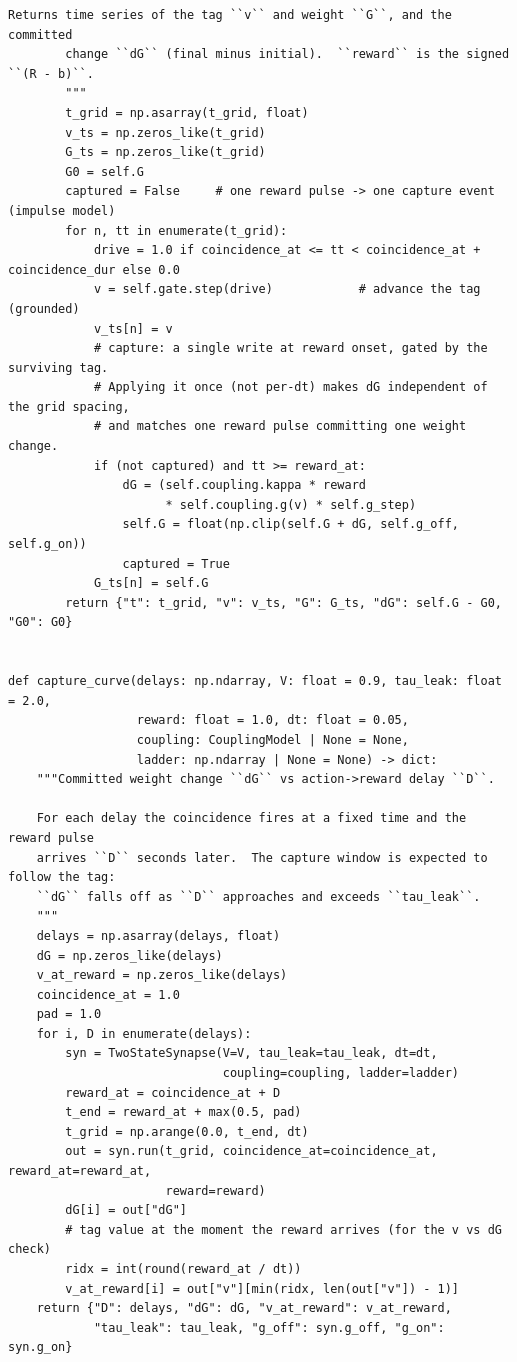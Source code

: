 \begin{lstlisting}[caption={mrl\_trace/capture.py},label={lst:siox-src-capture}]
        Returns time series of the tag ``v`` and weight ``G``, and the committed
        change ``dG`` (final minus initial).  ``reward`` is the signed ``(R - b)``.
        """
        t_grid = np.asarray(t_grid, float)
        v_ts = np.zeros_like(t_grid)
        G_ts = np.zeros_like(t_grid)
        G0 = self.G
        captured = False     # one reward pulse -> one capture event (impulse model)
        for n, tt in enumerate(t_grid):
            drive = 1.0 if coincidence_at <= tt < coincidence_at + coincidence_dur else 0.0
            v = self.gate.step(drive)            # advance the tag (grounded)
            v_ts[n] = v
            # capture: a single write at reward onset, gated by the surviving tag.
            # Applying it once (not per-dt) makes dG independent of the grid spacing,
            # and matches one reward pulse committing one weight change.
            if (not captured) and tt >= reward_at:
                dG = (self.coupling.kappa * reward
                      * self.coupling.g(v) * self.g_step)
                self.G = float(np.clip(self.G + dG, self.g_off, self.g_on))
                captured = True
            G_ts[n] = self.G
        return {"t": t_grid, "v": v_ts, "G": G_ts, "dG": self.G - G0, "G0": G0}


def capture_curve(delays: np.ndarray, V: float = 0.9, tau_leak: float = 2.0,
                  reward: float = 1.0, dt: float = 0.05,
                  coupling: CouplingModel | None = None,
                  ladder: np.ndarray | None = None) -> dict:
    """Committed weight change ``dG`` vs action->reward delay ``D``.

    For each delay the coincidence fires at a fixed time and the reward pulse
    arrives ``D`` seconds later.  The capture window is expected to follow the tag:
    ``dG`` falls off as ``D`` approaches and exceeds ``tau_leak``.
    """
    delays = np.asarray(delays, float)
    dG = np.zeros_like(delays)
    v_at_reward = np.zeros_like(delays)
    coincidence_at = 1.0
    pad = 1.0
    for i, D in enumerate(delays):
        syn = TwoStateSynapse(V=V, tau_leak=tau_leak, dt=dt,
                              coupling=coupling, ladder=ladder)
        reward_at = coincidence_at + D
        t_end = reward_at + max(0.5, pad)
        t_grid = np.arange(0.0, t_end, dt)
        out = syn.run(t_grid, coincidence_at=coincidence_at, reward_at=reward_at,
                      reward=reward)
        dG[i] = out["dG"]
        # tag value at the moment the reward arrives (for the v vs dG check)
        ridx = int(round(reward_at / dt))
        v_at_reward[i] = out["v"][min(ridx, len(out["v"]) - 1)]
    return {"D": delays, "dG": dG, "v_at_reward": v_at_reward,
            "tau_leak": tau_leak, "g_off": syn.g_off, "g_on": syn.g_on}
\end{lstlisting}

